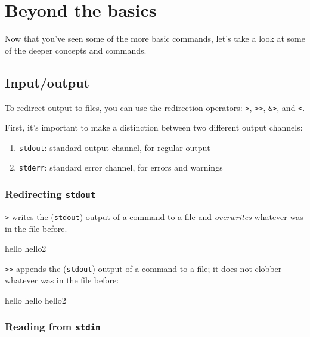 \chapter{Beyond the basics}

Now that you've seen some of the more basic commands, let's take a look at some
of the deeper concepts and commands.

\section{Input/output}

To redirect output to files, you can use the redirection operators: \verb|>|,
\verb|>>|, \verb|&>|, and \verb|<|.

First, it's important to make a distinction between two different output
channels:

\begin{enumerate}
 \item \verb|stdout|: standard output channel, for regular output
 \item \verb|stderr|: standard error channel, for errors and warnings
\end{enumerate}

\subsection{Redirecting \texttt{stdout}}

\verb|>| writes the (\verb|stdout|) output of a command to a file and \emph{overwrites}
whatever was in the file before.

\begin{prompt}
hello
hello2
\end{prompt}

\verb|>>| appends the (\verb|stdout|) output of a command to a file; it does not clobber
whatever was in the file before:

\begin{prompt}
hello
hello
hello2
\end{prompt}

\subsection{Reading from \texttt{stdin}}

